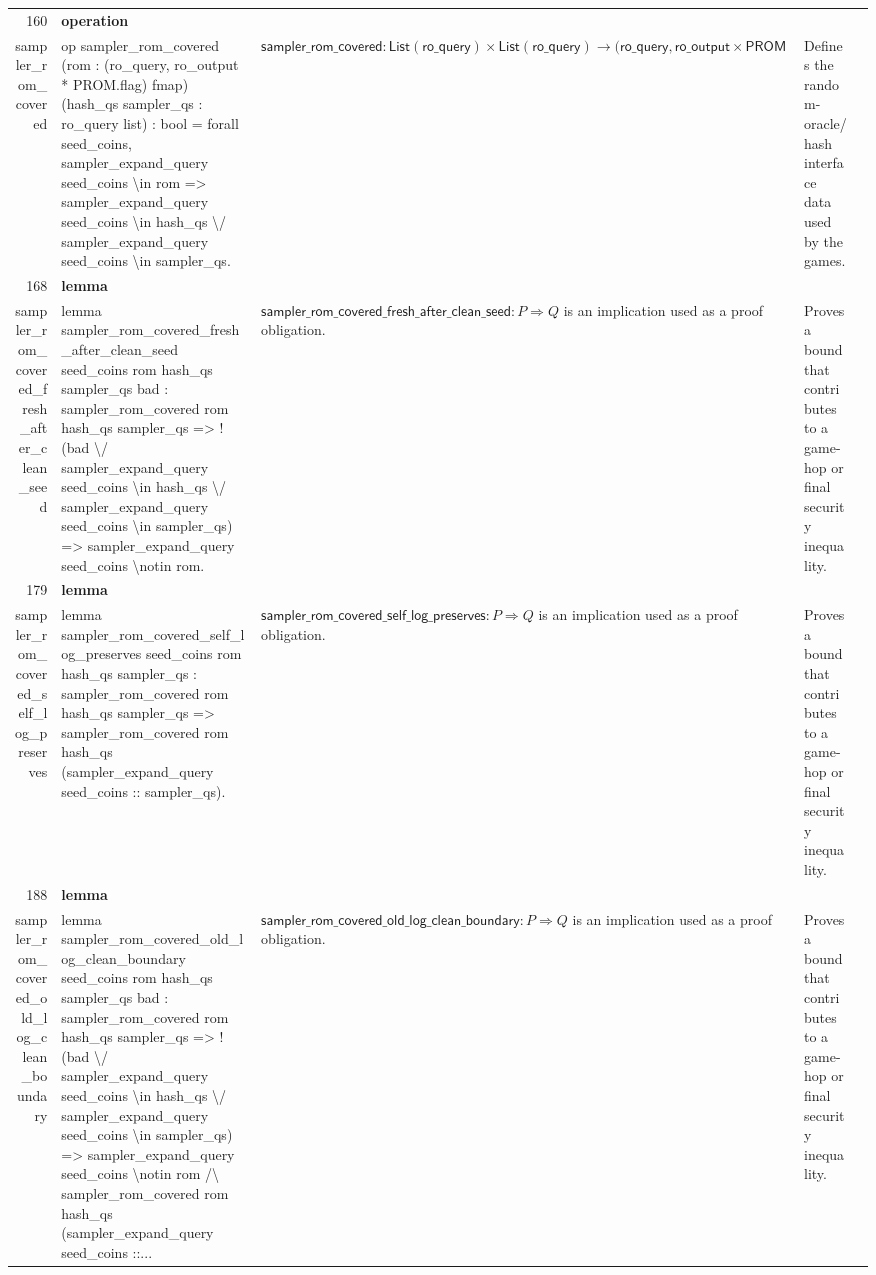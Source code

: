 \documentclass[10pt]{article}
\newcommand{\ec}[1]{\begingroup\ttfamily\scriptsize #1\endgroup}
\begin{document}
\begin{longtable}{r L{0.17\textwidth} L{0.26\textwidth} L{0.27\textwidth} L{0.20\textwidth}}
160 & \textbf{operation}\\\ec{sampler\_rom\_covered} & \ec{op sampler\_rom\_covered (rom : (ro\_query, ro\_output * PROM.flag) fmap) (hash\_qs sampler\_qs : ro\_query list) : bool = forall seed\_coins, sampler\_expand\_query seed\_coins \textbackslash{}in rom => sampler\_expand\_query seed\_coins \textbackslash{}in hash\_qs \textbackslash{}/ sampler\_expand\_query seed\_coins \textbackslash{}in sampler\_qs.} & \(\mathsf{sampler\_rom\_covered} : \mathsf{List}(\mathsf{ro\_query}) \times \mathsf{List}(\mathsf{ro\_query}) \to \mathsf{(ro\_query, ro\_output} \times \mathsf{PROM}\) & Defines the random-oracle/hash interface data used by the games. \\
168 & \textbf{lemma}\\\ec{sampler\_rom\_covered\_fresh\_after\_clean\_seed} & \ec{lemma sampler\_rom\_covered\_fresh\_after\_clean\_seed seed\_coins rom hash\_qs sampler\_qs bad : sampler\_rom\_covered rom hash\_qs sampler\_qs => ! (bad \textbackslash{}/ sampler\_expand\_query seed\_coins \textbackslash{}in hash\_qs \textbackslash{}/ sampler\_expand\_query seed\_coins \textbackslash{}in sampler\_qs) => sampler\_expand\_query seed\_coins \textbackslash{}notin rom.} & \(\mathsf{sampler\_rom\_covered\_fresh\_after\_clean\_seed} : P \Rightarrow Q\) is an implication used as a proof obligation. & Proves a bound that contributes to a game-hop or final security inequality. \\
179 & \textbf{lemma}\\\ec{sampler\_rom\_covered\_self\_log\_preserves} & \ec{lemma sampler\_rom\_covered\_self\_log\_preserves seed\_coins rom hash\_qs sampler\_qs : sampler\_rom\_covered rom hash\_qs sampler\_qs => sampler\_rom\_covered rom hash\_qs (sampler\_expand\_query seed\_coins :: sampler\_qs).} & \(\mathsf{sampler\_rom\_covered\_self\_log\_preserves} : P \Rightarrow Q\) is an implication used as a proof obligation. & Proves a bound that contributes to a game-hop or final security inequality. \\
188 & \textbf{lemma}\\\ec{sampler\_rom\_covered\_old\_log\_clean\_boundary} & \ec{lemma sampler\_rom\_covered\_old\_log\_clean\_boundary seed\_coins rom hash\_qs sampler\_qs bad : sampler\_rom\_covered rom hash\_qs sampler\_qs => ! (bad \textbackslash{}/ sampler\_expand\_query seed\_coins \textbackslash{}in hash\_qs \textbackslash{}/ sampler\_expand\_query seed\_coins \textbackslash{}in sampler\_qs) => sampler\_expand\_query seed\_coins \textbackslash{}notin rom /\textbackslash{} sampler\_rom\_covered rom hash\_qs (sampler\_expand\_query seed\_coins ::...} & \(\mathsf{sampler\_rom\_covered\_old\_log\_clean\_boundary} : P \Rightarrow Q\) is an implication used as a proof obligation. & Proves a bound that contributes to a game-hop or final security inequality. \\

\end{longtable}
\end{document}
